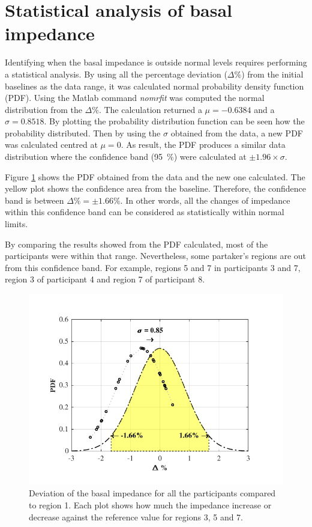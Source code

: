 \section{Statistical analysis of basal impedance}
\label{senction basal 4} 
Identifying when the basal impedance is outside normal levels requires performing a statistical analysis. By using all the percentage deviation ($\Delta \%$) from the initial baselines as the data range, it was calculated normal probability density function (PDF). Using the Matlab command \textit{nomrfit} was computed the normal distribution from the $\Delta \%$. The calculation returned a $\mu = -0.6384$ and a $\sigma = 0.8518$. By plotting the probability distribution function can be seen how the probability distributed. Then by using the $\sigma$ obtained from the data, a new PDF was calculated centred at $\mu = 0$. As result, the PDF produces a similar data distribution where the confidence band (\SI{95}{\percent}) were calculated at $\pm 1.96 \times\sigma$.

Figure \ref{fig:basal pdf} shows the PDF obtained from the data and the new one calculated. The yellow plot shows the confidence area from the baseline. Therefore, the confidence band is between $\Delta \% = \pm 1.66 \%$. In other words, all the changes of impedance within this confidence band can be considered as statistically within normal limits. 

By comparing the results showed from the PDF calculated, most of the participants were within that range. Nevertheless, some partaker's regions are out from this confidence band. For example, regions 5 and 7 in participants 3 and 7, region 3 of participant 4 and region 7 of participant 8.

\begin{figure}[!htbp]  %
	\centering
	\includegraphics[width=12cm,keepaspectratio, trim={0cm 0cm 0cm 0cm},clip]{figure_b_5}    
	\caption[Percentil change of baseline imepdance]{Deviation of the basal impedance for all the participants compared to region 1. Each plot shows how much the impedance increase or decrease against the reference value for regions 3, 5 and 7. }
	\label{fig:basal pdf} 
\end{figure}

